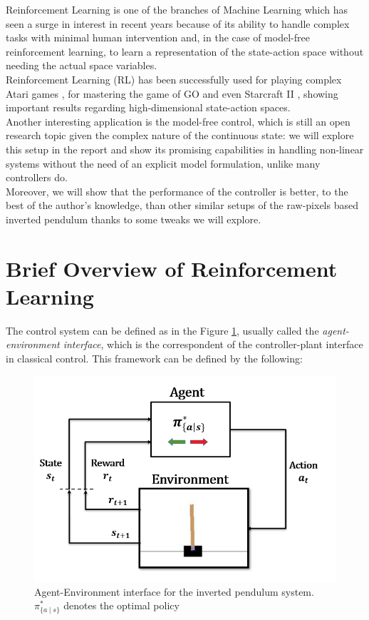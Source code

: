 \documentclass[11pt]{article}
\begin{document}
Reinforcement Learning \cite{sutton1998introduction} is one of the branches of Machine Learning which has seen a surge in interest in recent years because of its ability to handle complex tasks with minimal human intervention and, in the case of model-free reinforcement learning, to learn a representation of the state-action space without needing the actual space variables.\\
Reinforcement Learning (RL) has been successfully used for playing complex Atari games \cite{mnih2013playing}, for mastering the game of GO \cite{Silver_2016} and even Starcraft II \cite{Starcraft}, showing important results regarding high-dimensional state-action spaces.\\
Another interesting application is the model-free control, which is still an open research topic \cite{DBLP:journals/corr/abs-1912-03513} given the complex nature of the continuous state: we will explore this setup in the report and show its promising capabilities in handling non-linear systems without the need of an explicit model formulation, unlike many controllers do. \\
Moreover, we will show that the performance of the controller is better, to the best of the author's knowledge, than other similar setups of the raw-pixels based inverted pendulum thanks to some tweaks we will explore.

\section{Brief Overview of Reinforcement Learning}
The control system can be defined as in the Figure \ref{fig:agentenvironment}, usually called the \textit{agent-environment interface}, which is the correspondent of the controller-plant interface in classical control. This framework can be defined by the following:

\begin{figure}[h]
	\centering
	\includegraphics[width=12cm]{agent-environment.png}
	\caption{Agent-Environment interface for the inverted pendulum system. $\pi^*_{ \{ a \mid s \} }$ denotes the optimal policy}
	\label{fig:agentenvironment}
\end{figure}
\end{document}
